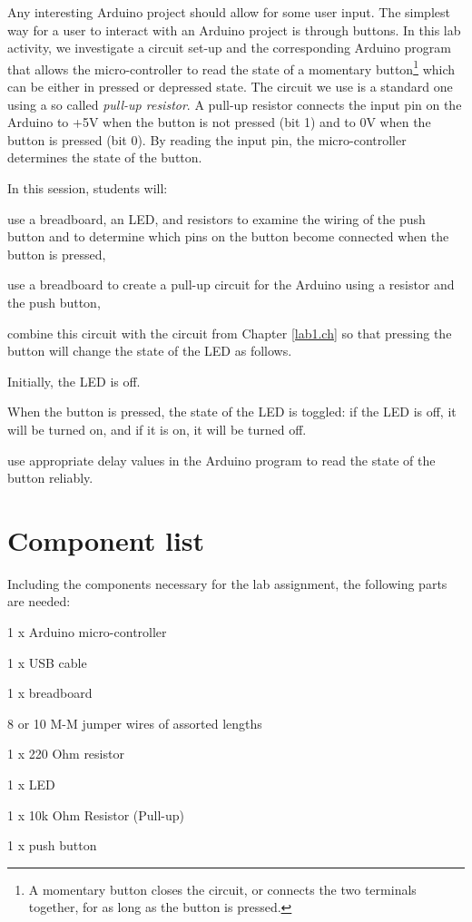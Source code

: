 \documentclass[12pt]{book}
\begin{document}
Any interesting Arduino project should allow for some user input. The
simplest way for a user to interact with an Arduino project is through
buttons. 
In this lab activity, we investigate a circuit set-up and the
corresponding Arduino program that allows the micro-controller to read
the state of a momentary button\footnote{A momentary button closes the
  circuit, or connects the two terminals together, for as long as the
  button is pressed.} which can be either in pressed or depressed state. The circuit we use is a
standard one using a so called \emph{pull-up resistor}. A pull-up
resistor  connects the input pin on the Arduino to +5V when the button is
not pressed (bit 1) and to 0V when the button is pressed (bit 0). By
reading the input pin, the micro-controller determines the state of
the button. 

In this session, students will:
\begin{compactitem}[--]
\item use a breadboard, an LED, and resistors to examine the wiring of
  the push button and to determine which pins on the button become connected when the
  button is pressed, 
\item use a breadboard to create a pull-up circuit for the Arduino using a
  resistor and the push button,
\item combine this circuit with the circuit from Chapter
  \ref{lab1.ch} so that pressing the button will change the state of
  the LED as follows.
\begin{compactitem}[-]
\item Initially, the LED is off.
\item When the button is pressed, the state of the LED is toggled: if
  the LED is off, it will be turned on, and if it is on, it will be
  turned off. 
\end{compactitem}
\item use appropriate delay values in the Arduino program to read the
  state of the button reliably. 
\end{compactitem}


\section{Component list}

Including the components necessary for the lab assignment, the following
parts are needed:
\begin{compactitem}[--]
  \item 1 x Arduino micro-controller
  \item 1 x USB cable
  \item 1 x breadboard
  \item 8 or 10 M-M jumper wires of assorted lengths
	\item 1 x 220 Ohm resistor
	\item 1 x LED
  \item 1 x 10k Ohm Resistor (Pull-up)
  \item 1 x push button
\end{compactitem}
\end{document}
